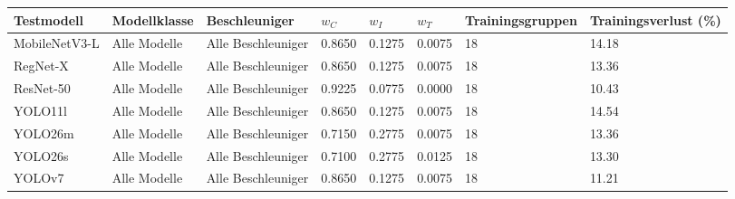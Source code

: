 \begin{tabular}{@{}llllllll@{}}
\toprule
Testmodell & Modellklasse & Beschleuniger & $w_C$ & $w_I$ & $w_T$ & Trainingsgruppen & Trainingsverlust (\%) \\
\midrule
MobileNetV3-L & Alle Modelle & Alle Beschleuniger & 0.8650 & 0.1275 & 0.0075 & 18 & 14.18 \\
RegNet-X & Alle Modelle & Alle Beschleuniger & 0.8650 & 0.1275 & 0.0075 & 18 & 13.36 \\
ResNet-50 & Alle Modelle & Alle Beschleuniger & 0.9225 & 0.0775 & 0.0000 & 18 & 10.43 \\
YOLO11l & Alle Modelle & Alle Beschleuniger & 0.8650 & 0.1275 & 0.0075 & 18 & 14.54 \\
YOLO26m & Alle Modelle & Alle Beschleuniger & 0.7150 & 0.2775 & 0.0075 & 18 & 13.36 \\
YOLO26s & Alle Modelle & Alle Beschleuniger & 0.7100 & 0.2775 & 0.0125 & 18 & 13.30 \\
YOLOv7 & Alle Modelle & Alle Beschleuniger & 0.8650 & 0.1275 & 0.0075 & 18 & 11.21 \\
\bottomrule
\end{tabular}
